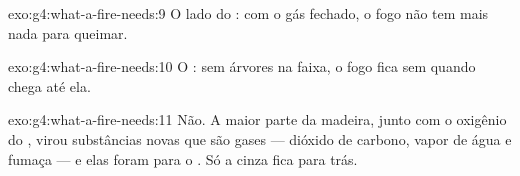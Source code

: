 \begin{solution}{exo:g4:what-a-fire-needs:9}
O lado do : com o gás fechado, o fogo não tem mais nada para
queimar.
\end{solution}

\begin{solution}{exo:g4:what-a-fire-needs:10}
O : sem árvores na faixa, o fogo fica sem  quando
chega até ela.
\end{solution}

\begin{solution}{exo:g4:what-a-fire-needs:11}
Não. A maior parte da madeira, junto com o oxigênio do , virou
substâncias novas que são gases --- dióxido de carbono, vapor de água e
fumaça --- e elas foram para o . Só a cinza fica para trás.
\end{solution}
